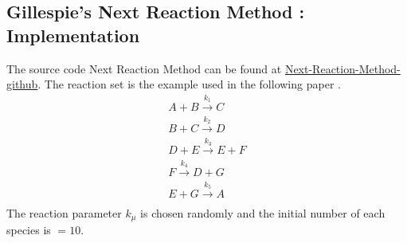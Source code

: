 \documentclass[11pt,a4paper]{article}
\begin{document}
\subsection{Gillespie's Next Reaction Method : Implementation}
The source code Next Reaction Method can be found at \href{https://github.com/Prateeba/TRAN-F501-Internship-201819/tree/master/Code/G_next_reaction}{Next-Reaction-Method-github}. The reaction set is the example used in the following paper \cite{gibson_efficient_2000}.
\begin{gather}
  {A + B \xrightarrow{k_{1}} C}      \\
  {B + C \xrightarrow{k_{2}} D}      \\
  {D + E \xrightarrow{k_{3}} E + F}     \\
  {F \xrightarrow{k_{4}} D + G}     \\
  {E + G \xrightarrow{k_{5}} A} \\
\end{gather}
The reaction parameter $k_{\mu}$ is chosen randomly and the initial number of each species is $ = 10$.
\end{document}
